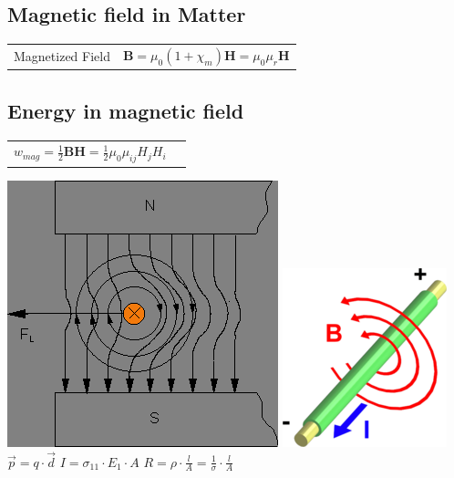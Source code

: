 		\subsection{Magnetic field in Matter}
		\begin{tabularx}{\columnwidth}{lX}
			Magnetized Field & $  \mathbf{B} = \mu_0(1+ \chi_m)\mathbf{H} =  \mu_0\mu_r\mathbf{H}$	\\
		\end{tabularx}
		
		\subsection{Energy in magnetic field}
		\begin{tabularx}{\columnwidth}{lX}
			$w_{mag} = \frac{1}{2}\mathbf{BH}= \frac{1}{2}\mu_0\mu_{ij}H_j H_i$\\
		\end{tabularx}

				\includegraphics[scale=0.5]{images/DrahtZwischenPolen.png}
				\includegraphics[scale=0.5]{images/B-Feld.png}
			$ \vec{p}=q\cdot\vec{d} $
			$ I = \sigma_{11} \cdot E_1 \cdot A $
		$ R=\rho\cdot\frac{l}{A}=\frac{1}{\sigma} \cdot\frac{l}{A}$\\


